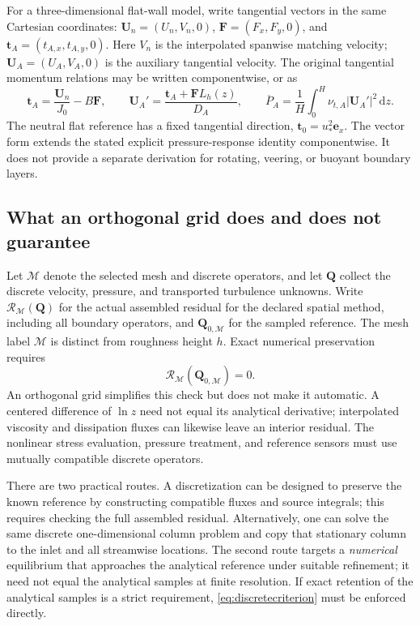 \documentclass[11pt,a4paper]{article}
\numberwithin{equation}{section}
\newcommand{\dd}{\mathrm{d}}
\newcommand{\ust}{u_*}
\newcommand{\avg}[1]{\overline{#1}}
\begin{document}
For a three-dimensional flat-wall model, write tangential vectors in
the same Cartesian coordinates: $\bm U_n=(U_n,V_n,0)$,
$\bm F=(F_x,F_y,0)$, and $\bm t_A=(t_{A,x},t_{A,y},0)$. Here
$V_n$ is the interpolated spanwise matching velocity;
$\bm U_A=(U_A,V_A,0)$ is the auxiliary tangential velocity.
The original tangential momentum relations may be written
componentwise, or as
\begin{equation}
 \bm t_A=\frac{\bm U_n}{J_0}-B\bm F,\qquad
 \bm U_A'=\frac{\bm t_A+\bm F L_h(z)}{D_A},\qquad
 \avg P_A=\frac1H\int_0^H
 \nu_{t,A}\left|\bm U_A'\right|^2\,\dd z.
\label{eq:3d}
\end{equation}
The neutral flat reference has a fixed tangential direction,
$\bm t_0=\ust^2\bm e_x$. The vector form extends the stated
explicit pressure-response identity componentwise. It does not provide
a separate derivation for rotating, veering, or buoyant boundary layers.

\subsection{What an orthogonal grid does and does not guarantee}
Let $\mathcal M$ denote the selected mesh and discrete operators, and
let $\bm Q$ collect the discrete velocity, pressure, and transported
turbulence unknowns. Write $\mathcal R_{\mathcal M}(\bm Q)$ for the actual
assembled residual for the declared spatial method, including all
boundary operators, and $\bm Q_{0,\mathcal M}$ for the sampled reference.
The mesh label $\mathcal M$ is distinct from roughness height $h$. Exact numerical preservation
requires
\begin{equation}
 \boxed{\mathcal R_{\mathcal M}(\bm Q_{0,\mathcal M})=0.}
\label{eq:discretecriterion}
\end{equation}
An orthogonal grid simplifies this check but does not make it automatic.
A centered difference of $\ln z$ need not equal its analytical derivative;
interpolated viscosity and dissipation fluxes can likewise leave an
interior residual. The nonlinear stress evaluation, pressure treatment,
and reference sensors must use mutually compatible discrete operators.

There are two practical routes. A discretization can be designed to
preserve the known reference by constructing compatible fluxes and source
integrals; this requires checking the full assembled residual. Alternatively,
one can solve the same discrete one-dimensional column problem and copy
that stationary column to the inlet and all streamwise locations.
The second route targets a \emph{numerical} equilibrium that approaches
the analytical reference under suitable refinement; it need not equal
the analytical samples at finite resolution.
If exact retention of the analytical samples is a strict requirement,
\cref{eq:discretecriterion} must be enforced directly.
\end{document}
